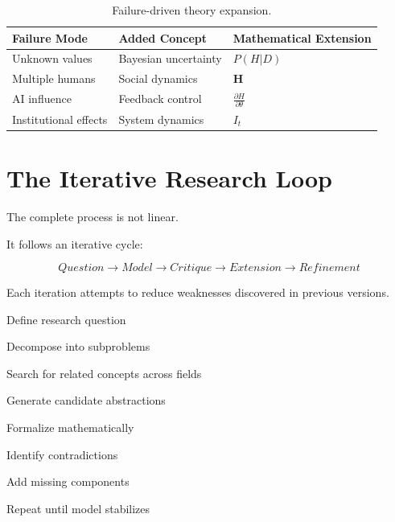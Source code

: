 \documentclass[11pt]{article}
\begin{document}
\begin{table}[h]

\centering

\begin{tabular}{lll}

\toprule

Failure Mode & Added Concept & Mathematical Extension \\

\midrule

Unknown values
& Bayesian uncertainty
& $P(H|D)$
\\

Multiple humans
& Social dynamics
& $\mathbf H$
\\

AI influence
& Feedback control
& $\frac{\partial H}{\partial\theta}$
\\

Institutional effects
& System dynamics
& $I_t$
\\

\bottomrule

\end{tabular}

\caption{
Failure-driven theory expansion.
}

\end{table}



\section{The Iterative Research Loop}


The complete process is not linear.


It follows an iterative cycle:


\[
\boxed{
Question
\rightarrow
Model
\rightarrow
Critique
\rightarrow
Extension
\rightarrow
Refinement
}
\]


Each iteration attempts to reduce weaknesses discovered in previous
versions.



\begin{algorithm}

\caption{AI-Assisted Research Iteration}

\begin{algorithmic}


\STATE Define research question

\STATE Decompose into subproblems

\STATE Search for related concepts across fields

\STATE Generate candidate abstractions

\STATE Formalize mathematically

\STATE Identify contradictions

\STATE Add missing components

\STATE Repeat until model stabilizes


\end{algorithmic}

\end{algorithm}
\end{document}
